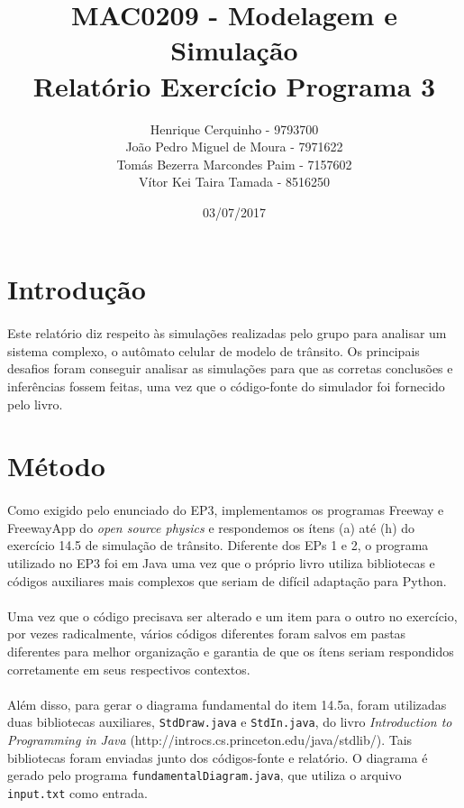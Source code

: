 \documentclass{article}
\title{MAC0209 - Modelagem e Simulação \\
Relatório Exercício Programa 3}
\author{Henrique Cerquinho - 9793700 \\
João Pedro Miguel de Moura - 7971622 \\
Tomás Bezerra Marcondes Paim - 7157602 \\
Vítor Kei Taira Tamada - 8516250}
\date{03/07/2017}
\begin{document}
\maketitle

\section{Introdução}
\paragraph{}Este relatório diz respeito às simulações realizadas pelo grupo para analisar um sistema complexo, o autômato celular de modelo de trânsito. Os principais desafios foram conseguir analisar as simulações para que as corretas conclusões e inferências fossem feitas, uma vez que o código-fonte do simulador foi fornecido pelo livro.

\section{Método}
\paragraph{}Como exigido pelo enunciado do EP3, implementamos os programas Freeway e FreewayApp do \textit{open source physics} e respondemos os ítens (a) até (h) do exercício 14.5 de simulação de trânsito. Diferente dos EPs 1 e 2, o programa utilizado no EP3 foi em Java uma vez que o próprio livro utiliza bibliotecas e códigos auxiliares mais complexos que seriam de difícil adaptação para Python.

\paragraph{}Uma vez que o código precisava ser alterado e um item para o outro no exercício, por vezes radicalmente, vários códigos diferentes foram salvos em pastas diferentes para melhor organização e garantia de que os ítens seriam respondidos corretamente em seus respectivos contextos.

\paragraph{}Além disso, para gerar o diagrama fundamental do item 14.5a, foram utilizadas duas bibliotecas auxiliares, \texttt{StdDraw.java} e \texttt{StdIn.java}, do livro \textit{Introduction to Programming in Java} (http://introcs.cs.princeton.edu/java/stdlib/). Tais bibliotecas foram enviadas junto dos códigos-fonte e relatório. O diagrama é gerado pelo programa \texttt{fundamentalDiagram.java}, que utiliza o arquivo \texttt{input.txt} como entrada.
\end{document}
